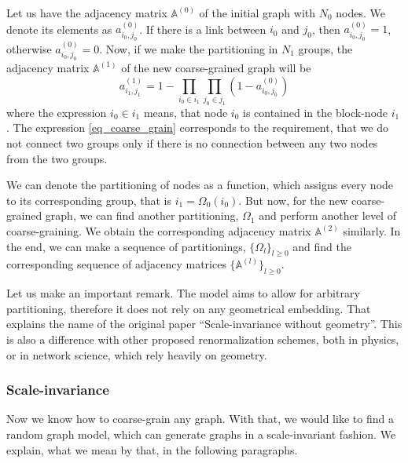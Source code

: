 Let us have the adjacency matrix $\mathbb{A}^{(0)}$ of the initial graph with $N_0$ nodes. We denote its elements as $a_{i_0,j_0}^{(0)}$. If there is a link between $i_0$ and $j_0$, then $a_{i_0,j_0}^{(0)} = 1$, otherwise $a_{i_0,j_0}^{(0)} = 0$. Now, if we make the partitioning in $N_1$ groups, the adjacency matrix $\mathbb{A}^{(1)}$ of the new coarse-grained graph will be 
\begin{equation}
    a_{i_1,j_1}^{(1)} = 1 - \prod_{i_0 \in i_1}\prod_{j_0 \in j_1} (1 - a_{i_0,j_0}^{(0)})
\label{eq_coarse_grain}
\end{equation}
where the expression $i_0 \in i_1$ means, that node $i_0$ is contained in the block-node $i_1$. The expression \ref{eq_coarse_grain} corresponds to the requirement, that we do not connect two groups only if there is no connection between any two nodes from the two groups.

We can denote the partitioning of nodes as a function, which assigns every node to its corresponding group, that is $i_1 = \Omega_0(i_0)$. But now, for the new coarse-grained graph, we can find another partitioning, $\Omega_1$ and perform another level of coarse-graining. We obtain the corresponding adjacency matrix $\mathbb{A}^{(2)}$ similarly. In the end, we can make a sequence of partitionings, $\{\Omega_l\}_{l\geq0}$ and find the corresponding sequence of adjacency matrices $\{\mathbb{A}^{(l)}\}_{l\geq0}$. 

Let us make an important remark. The model aims to allow for arbitrary partitioning, therefore it does not rely on any geometrical embedding. That explains the name of the original paper ``Scale-invariance without geometry''. This is also a difference with other proposed renormalization schemes, both in physics, or in network science, which rely heavily on geometry.

\subsubsection{Scale-invariance}
Now we know how to coarse-grain any graph. With that, we would like to find a random graph model, which can generate graphs in a scale-invariant fashion. We explain, what we mean by that, in the following paragraphs.

